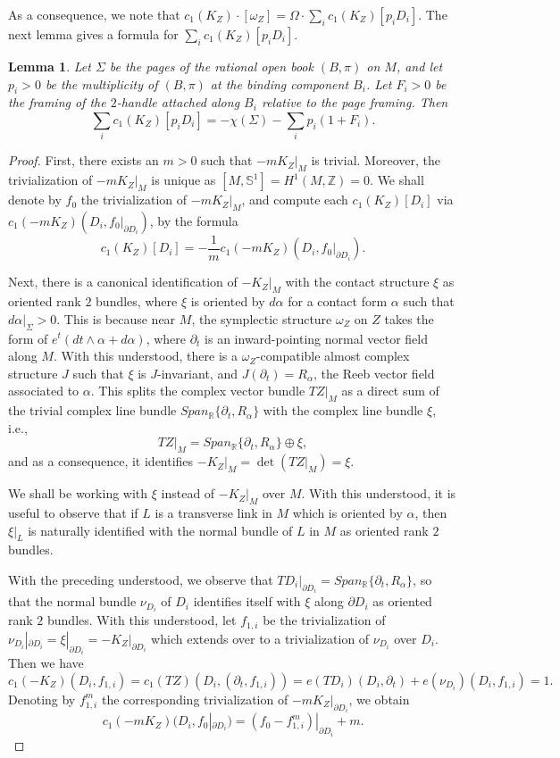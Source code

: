 \documentclass[11pt]{amsart}
\theoremstyle{plain}
\numberwithin{theorem}{section}
\newtheorem{lemma}[theorem]{Lemma}
\theoremstyle{definition}
\newcommand{\R}{{\mathbb R}}
\newcommand{\Z}{{\mathbb Z}}
\newcommand{\s}{{\mathbb S}}
\begin{document}
As a consequence, we note that $c_1(K_Z)\cdot [\omega_Z]=\Omega \cdot \sum_i c_1(K_Z)[p_i D_i]$.
The next lemma gives a formula for $\sum_i c_1(K_Z)[p_iD_i]$. 

\begin{lemma}
Let $\Sigma$ be the pages of the rational open book $(B,\pi)$ on $M$, and let $p_i>0$ be the multiplicity of $(B,\pi)$ at the binding component $B_i$. Let $F_i>0$ be the framing of the $2$-handle 
attached along $B_i$ relative to the page framing. Then 
$$
\sum_i c_1(K_Z)[p_iD_i]= -\chi(\Sigma)-\sum_i p_i (1+F_i).
$$
\end{lemma}

\begin{proof}
First, there exists an $m>0$ such that $-mK_Z|_M$ is trivial. Moreover, the trivialization of 
$-mK_Z|_M$
is unique as $[M,\s^1]=H^1(M,\Z)=0$. We shall denote by $f_0$ the trivialization of $-mK_Z|_M$,
and compute each $c_1(K_Z)[D_i]$ via $c_1(-mK_Z)(D_i, f_0|_{\partial D_i})$, by the formula
$$
c_1(K_Z)[D_i]=-\frac{1}{m} c_1(-mK_Z)(D_i, f_0|_{\partial D_i}).
$$

Next, there is a canonical identification of $-K_Z|_M$ with the contact structure $\xi$ as oriented 
rank $2$ bundles, where $\xi$ is oriented by $d\alpha$ for a contact form $\alpha$ such that
$d\alpha|_{\Sigma}>0$. This is because near $M$, the symplectic structure $\omega_Z$ on $Z$ 
takes the form of $e^t(dt\wedge \alpha+d\alpha)$, where $\partial_t$ is an inward-pointing normal vector field along $M$. With this understood, there is a $\omega_Z$-compatible almost complex structure $J$ such that $\xi$ is $J$-invariant, and $J(\partial_t)=R_\alpha$, the Reeb vector field associated to $\alpha$. This splits the complex vector bundle $TZ|_M$ as a direct sum of the trivial complex line bundle $Span_\R\{\partial_t,R_\alpha\}$ with the complex line bundle $\xi$, i.e.,
$$
TZ|_M=Span_\R\{\partial_t,R_\alpha\}\oplus \xi, 
$$
and as a consequence, it identifies $-K_Z|_M =\det (TZ|_M)=\xi$. 

We shall be working with $\xi$ instead of $-K_Z|_M$ over $M$. With this understood, it is useful
to observe that if $L$ is a transverse link in $M$ which is oriented by $\alpha$, then $\xi|_L$
is naturally identified with the normal bundle of $L$ in $M$ as oriented rank $2$ bundles. 

With the preceding understood, we observe that $TD_i|_{\partial D_i}=Span_\R\{\partial_t,R_\alpha\}$,
so that the normal bundle $\nu_{D_i}$ of $D_i$ identifies itself with $\xi$ along $\partial D_i$
as oriented rank $2$ bundles. With this understood, let $f_{1,i}$ be the trivialization of $\nu_{D_i}|_{\partial D_i}=\xi|_{\partial D_i}=-K_Z|_{\partial D_i}$ which extends over to a trivialization of 
$\nu_{D_i}$ over $D_i$. Then we have
$$
c_1(-K_Z)(D_i, f_{1,i})=c_1(TZ)(D_i, (\partial_t,f_{1,i}))=e(TD_i)(D_i,\partial_t) + e(\nu_{D_i})(D_i,f_{1,i})=1.
$$
Denoting by $f_{1,i}^m$ the corresponding trivialization of $-mK_Z|_{\partial D_i}$, we obtain 
$$
c_1(-mK_Z)(D_i, f_0|_{\partial D_i})=(f_0-f_{1,i}^m)|_{\partial D_i}+m.
$$


\end{proof}
\end{document}
